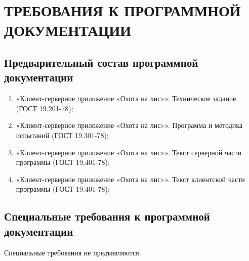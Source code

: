 \section{ТРЕБОВАНИЯ К ПРОГРАММНОЙ ДОКУМЕНТАЦИИ}

\subsection{Предварительный состав программной документации}
\label{docs.list}

\begin{enumerate}
\item «Клиент-серверное приложение «Охота на лис»». Техническое задание (ГОСТ 19.201-78);
\item «Клиент-серверное приложение «Охота на лис»». Программа и методика испытаний
(ГОСТ 19.301-78);
\item «Клиент-серверное приложение «Охота на лис»». Текст серверной части программы (ГОСТ 19.401-78);
\item «Клиент-серверное приложение «Охота на лис»». Текст клиентской части программы (ГОСТ 19.401-78);
\end{enumerate}

\subsection{Специальные требования к программной документации}
\label{docs.extra}
Специальные требования не предъявляются.

\clearpage